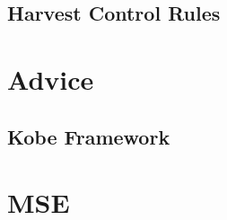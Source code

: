 \documentclass[shortnames,nojss,article]{jss}
\newenvironment{mylisting}
{\begin{list}{}{\setlength{\leftmargin}{1em}}\item\scriptsize\bfseries}
{\end{list}}
\begin{document}
\subsection{Harvest Control Rules}

\begin{mylisting}\begin{center}\begin{minipage}[H]{0.95\textwidth}\begin{shaded} 
\end{shaded}\end{minipage}\end{center}\end{mylisting}

\section{Advice}

\subsection{Kobe Framework}

\begin{mylisting}\begin{center}\begin{minipage}[H]{0.95\textwidth}\begin{shaded} 
\end{shaded}\end{minipage}\end{center}\end{mylisting}

\section{MSE}

 
 
\end{document}

